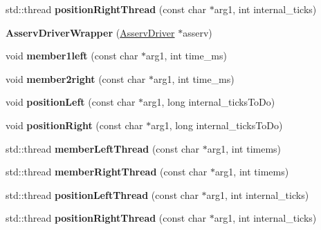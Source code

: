 \begin{DoxyCompactItemize}
std\+::thread {\bfseries position\+Right\+Thread} (const char $\ast$arg1, int internal\+\_\+ticks)
\item 
\mbox{\label{classAsservDriverWrapper_ac9cdc2a725579a0e67e3e5d70fea98ff}} 
{\bfseries Asserv\+Driver\+Wrapper} (\hyperlink{classAsservDriver}{Asserv\+Driver} $\ast$asserv)
\item 
\mbox{\label{classAsservDriverWrapper_a4d3b337fd6beed104ba60b69213344cc}} 
void {\bfseries member1left} (const char $\ast$arg1, int time\+\_\+ms)
\item 
\mbox{\label{classAsservDriverWrapper_af356c1725a4b8dac9994dd0d94e12069}} 
void {\bfseries member2right} (const char $\ast$arg1, int time\+\_\+ms)
\item 
\mbox{\label{classAsservDriverWrapper_aad45be064ecfd5eed9c687875f0e92e5}} 
void {\bfseries position\+Left} (const char $\ast$arg1, long internal\+\_\+ticks\+To\+Do)
\item 
\mbox{\label{classAsservDriverWrapper_a4642069f82e26bf54045931a819a4d84}} 
void {\bfseries position\+Right} (const char $\ast$arg1, long internal\+\_\+ticks\+To\+Do)
\item 
\mbox{\label{classAsservDriverWrapper_a6d2ba86845397e2a65e62660f7d94710}} 
std\+::thread {\bfseries member\+Left\+Thread} (const char $\ast$arg1, int timems)
\item 
\mbox{\label{classAsservDriverWrapper_af629788681c4e3155c9fc56d6a783d8a}} 
std\+::thread {\bfseries member\+Right\+Thread} (const char $\ast$arg1, int timems)
\item 
\mbox{\label{classAsservDriverWrapper_a8c951da2eafa9448971f7f68088edec8}} 
std\+::thread {\bfseries position\+Left\+Thread} (const char $\ast$arg1, int internal\+\_\+ticks)
\item 
\mbox{\label{classAsservDriverWrapper_a0851aa582a82bf4cf9de2dcf240d585e}} 
std\+::thread {\bfseries position\+Right\+Thread} (const char $\ast$arg1, int internal\+\_\+ticks)

\end{DoxyCompactItemize}
